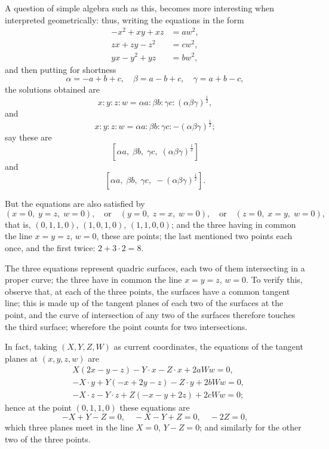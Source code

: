 \documentclass[11pt,a4paper]{book}
\begin{document}
\begin{note}
A question of simple algebra such as this, becomes more interesting when interpreted geometrically: thus, writing the equations in the form
\[
\begin{aligned}
-x^2 + xy + xz &= aw^2, \\
zx + zy - z^2 &= cw^2, \\
yx - y^2 + yz &= bw^2,
\end{aligned}
\]
and then putting for shortness
\[
\alpha = -a + b + c, \quad
\beta = a - b + c, \quad
\gamma = a + b - c,
\]
the solutions obtained are
\[
x : y : z : w = \alpha a : \beta b : \gamma c : (\alpha\beta\gamma)^{\frac{1}{2}},
\]
and
\[
x : y : z : w = \alpha a : \beta b : \gamma c : -(\alpha\beta\gamma)^{\frac{1}{2}};
\]
say these are
\[
[\alpha a, \; \beta b, \; \gamma c, \; (\alpha\beta\gamma)^{\frac{1}{2}}]
\]
and
\[
[\alpha a, \; \beta b, \; \gamma c, \; -(\alpha\beta\gamma)^{\frac{1}{2}}].
\]

But the equations are also satisfied by
\[
(x=0, \; y=z, \; w=0), \quad\text{or}\quad (y=0, \; z=x, \; w=0), \quad\text{or}\quad (z=0, \; x=y, \; w=0),
\]
that is, $(0,1,1,0)$, $(1,0,1,0)$, $(1,1,0,0)$; and the three having in common the line $x=y=z$, $w=0$, these are points; the last mentioned two points each once, and the first twice: $2 + 3 \cdot 2 = 8$.

The three equations represent quadric surfaces, each two of them intersecting in a proper curve; the three have in common the line $x=y=z$, $w=0$. To verify this, observe that, at each of the three points, the surfaces have a common tangent line; this is made up of the tangent planes of each two of the surfaces at the point, and the curve of intersection of any two of the surfaces therefore touches the third surface; wherefore the point counts for two intersections.

In fact, taking $(X,Y,Z,W)$ as current coordinates, the equations of the tangent planes at $(x,y,z,w)$ are
\[
\begin{aligned}
&X(2x-y-z) - Y\cdot x - Z\cdot x + 2aWw = 0, \\
&-X\cdot y + Y(-x+2y-z) - Z\cdot y + 2bWw = 0, \\
&-X\cdot z - Y\cdot z + Z(-x-y+2z) + 2cWw = 0;
\end{aligned}
\]
hence at the point $(0,1,1,0)$ these equations are
\[
-X + Y - Z = 0, \quad -X - Y + Z = 0, \quad -2Z = 0,
\]
which three planes meet in the line $X=0$, $Y-Z=0$; and similarly for the other two of the three points.
\end{note}
\end{document}
